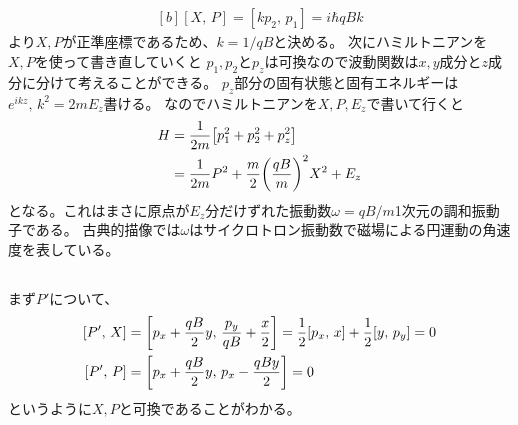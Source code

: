 \documentclass[../../master.tex]{subfiles}
\begin{document}
\subsection{}
\begin{equation}\begin{aligned}[b]
    [X,\,P] = [kp_2,\,p_1] = i\hbar qBk
\end{aligned}\end{equation}
より\(X,P\)が正準座標であるため、\(k=1/qB\)と決める。
次にハミルトニアンを\(X,P\)を使って書き直していくと
\(p_1,p_2\)と\(p_z\)は可換なので波動関数は\(x,y\)成分と\(z\)成分に分けて考えることができる。
\(p_z\)部分の固有状態と固有エネルギーは\(e^{ikz},\,k^2=2mE_z\)書ける。
なのでハミルトニアンを\(X,P,E_z\)で書いて行くと
\begin{equation}\begin{aligned}[b]
    H &= \frac{1}{2m}\qty[p_1^2 + p_2^2 +p_z^2]\\
    &= \frac{1}{2m}P^2 + \frac{m}{2}\qty(\frac{qB}{m})^2X^2 +E_z
\end{aligned}\end{equation}
となる。これはまさに原点が\(E_z\)分だけずれた振動数\(\omega = qB/m\)1次元の調和振動子である。
古典的描像では\(\omega\)はサイクロトロン振動数で磁場による円運動の角速度を表している。

\subsection{}
まず\(P'\)について、
\begin{equation}\begin{aligned}[b]
    [P',\,X] &= \qty[p_x+\frac{qB}{2}y,\,\frac{p_y}{qB}+\frac{x}{2}]
    = \frac{1}{2}[p_x,\,x]+\frac{1}{2}[y,\,p_y] =0\\
    [P',\,P] &= \qty[p_x+\frac{qB}{2}y,\,p_x-\frac{qBy}{2}] = 0
\end{aligned}\end{equation}
というように\(X,P\)と可換であることがわかる。
\end{document}
